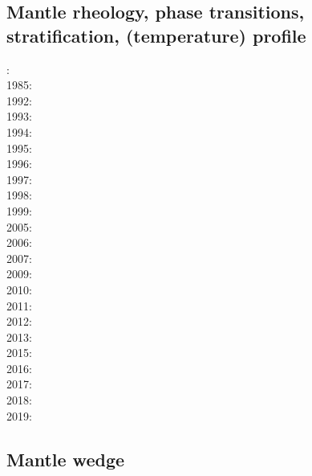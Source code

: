 \subsection{Mantle rheology, phase transitions, stratification, (temperature) profile}

{\scriptsize
{}: \cite{yusb82}\cite{chri82}\\
1985: \cite{chyu85}\\
1992: \cite{zhyh92}\\
1993: \cite{tasg93}\cite{best93}\cite{kief93}\\
1994: \cite{vayv94}\cite{zhgu94b}\cite{styu94}\\
1995: \cite{zhyu95}\cite{chri95}\cite{scta95}\\
1996: \cite{pelt96}\cite{mitr96}\\
1997: \cite{mifo97}\\
1998: \cite{cava98}\\
1999: \cite{sigh99}\cite{kehv99}\\
2005: \cite{hett05}\cite{nata05b}\\
2006: \cite{javd06}\cite{stca06}\\
2007: \cite{pazw07}\cite{mofm07}\cite{tanh07}\\
2009: \cite{natd09}\\
2010: \cite{kayy10}\\
2011: \cite{java11}\cite{faff11}\cite{nata11}\cite{vayj11}\\
2012: \cite{tack12}\cite{sato12}\cite{natd12}\\
2013: \cite{fakc13}\cite{taab13}\cite{jasv13}\\
2015: \cite{basn15}\\
2016: \cite{tiro16}\cite{beci16}\\
2017: \cite{vavs17}\cite{jasv17}\\
2018: \cite{mazh18}\\
2019: \cite{jasv19}
}

\subsection{Mantle wedge} 

